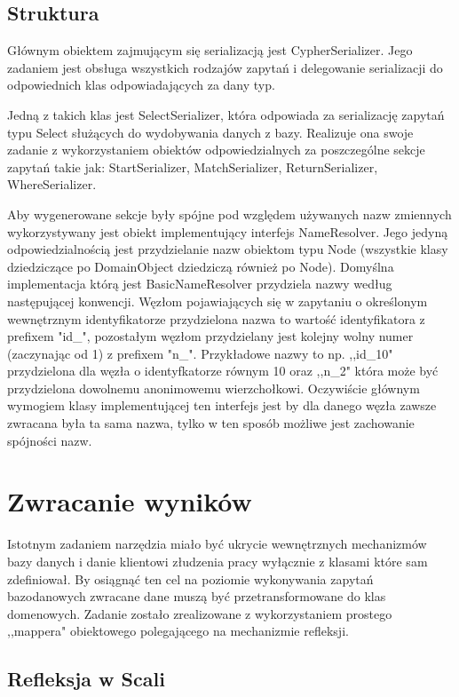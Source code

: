\documentclass[brudnopis]{xmgr}
\begin{document}
\subsection{Struktura}

Głównym obiektem zajmującym się serializacją jest CypherSerializer. Jego zadaniem jest obsługa wszystkich rodzajów zapytań i delegowanie serializacji do odpowiednich klas odpowiadających za dany typ.

Jedną z takich klas jest SelectSerializer, która odpowiada za serializację zapytań typu Select służących do wydobywania danych z bazy. Realizuje ona swoje zadanie z wykorzystaniem obiektów odpowiedzialnych za poszczególne sekcje zapytań takie jak: StartSerializer, MatchSerializer, ReturnSerializer, WhereSerializer.

Aby wygenerowane sekcje były spójne pod względem używanych nazw zmiennych wykorzystywany jest obiekt implementujący interfejs NameResolver. Jego jedyną odpowiedzialnością jest przydzielanie nazw obiektom typu Node (wszystkie klasy dziedziczące po DomainObject dziedziczą również po Node). Domyślna implementacja którą jest BasicNameResolver przydziela nazwy według następującej konwencji. Węzłom pojawiających się w zapytaniu o określonym wewnętrznym identyfikatorze przydzielona nazwa to wartość identyfikatora z prefixem "id\_", pozostałym węzłom przydzielany jest kolejny wolny numer (zaczynając od 1) z prefixem "n\_". Przykładowe nazwy to np. ,,id\_10" przydzielona dla węzła o identyfkatorze równym 10 oraz ,,n\_2" która może być przydzielona dowolnemu anonimowemu wierzchołkowi. Oczywiście głównym wymogiem klasy implementującej ten interfejs jest by dla danego węzła zawsze zwracana była ta sama nazwa, tylko w ten sposób możliwe jest zachowanie spójności nazw.

\section{Zwracanie wyników}

Istotnym zadaniem narzędzia miało być ukrycie wewnętrznych mechanizmów bazy danych i danie klientowi złudzenia pracy wyłącznie z klasami które sam zdefiniował. By osiągnąć ten cel na poziomie wykonywania zapytań bazodanowych zwracane dane muszą być przetransformowane do klas domenowych. Zadanie zostało zrealizowane z wykorzystaniem prostego ,,mappera" obiektowego polegającego na mechanizmie refleksji.

\subsection{Refleksja w Scali}
\end{document}
